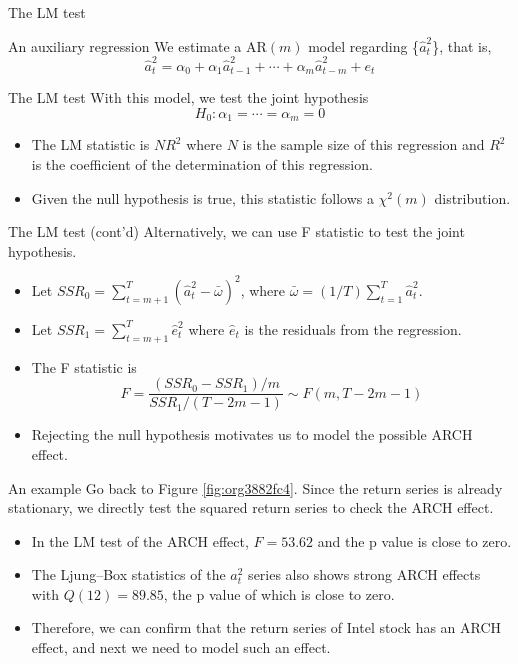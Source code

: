 \documentclass[presentation,10pt]{beamer}
\begin{document}
\begin{frame}[label={sec:org9c48f8f}]{The LM test}
\begin{block}{An auxiliary regression}
We estimate a AR\((m)\) model regarding \{\(\hat{a}^2_t\)\}, that is,
\[ \hat{a}^2_t = \alpha_0 + \alpha_1 \hat{a}_{t-1}^2 + \cdots +
\alpha_m \hat{a}^2_{t-m} + e_t \]
\end{block}

\begin{block}{The LM test}
With this model, we test the joint hypothesis
\[H_0: \alpha_1 = \cdots = \alpha_m = 0 \]
\begin{itemize}
\item The LM statistic is \(NR^2\) where \(N\) is the sample size of this
regression and \(R^2\) is the coefficient of the determination of this
regression.
\item Given the null hypothesis is true, this statistic follows
a \(\chi^2(m)\) distribution.
\end{itemize}
\end{block}
\end{frame}

\begin{frame}[label={sec:orgc899dc6}]{The LM test (cont'd)}
Alternatively, we can use F statistic to test the joint
hypothesis.
\begin{itemize}
\item Let \(SSR_0 = \sum_{t=m+1}^{T} (\hat{a}^2_{t} -
  \bar{\omega})^2\), where \(\bar{\omega} = (1/T) \sum_{t=1}^T
  \hat{a}^2_t\).
\item Let \(SSR_1 = \sum_{t=m+1}^T \hat{e}^2_t\) where \(\hat{e}_t\) is the
residuals from the regression.
\item The F statistic is
\[F = \frac{(SSR_0 - SSR_1)/m}{SSR_1/(T-2m-1)} \sim F(m, T-2m-1)\]
\item Rejecting the null hypothesis motivates us to model the possible
ARCH effect.
\end{itemize}
\end{frame}

\begin{frame}[label={sec:org1f5bc31}]{An example}
Go back to Figure \ref{fig:org3882fc4}. Since the return series is
already stationary, we directly test the squared return series to
check the ARCH effect.

\begin{itemize}
\item In the LM test of the ARCH effect, \(F = 53.62\) and the p value is
close to zero.
\item The Ljung–Box statistics of the \(a^2_t\) series also
shows strong ARCH effects with \(Q(12) = 89.85\), the p value of which is
close to zero.
\item Therefore, we can confirm that the return series of
Intel stock has an ARCH effect, and next we need to model such an
effect.
\end{itemize}
\end{frame}
\end{document}

